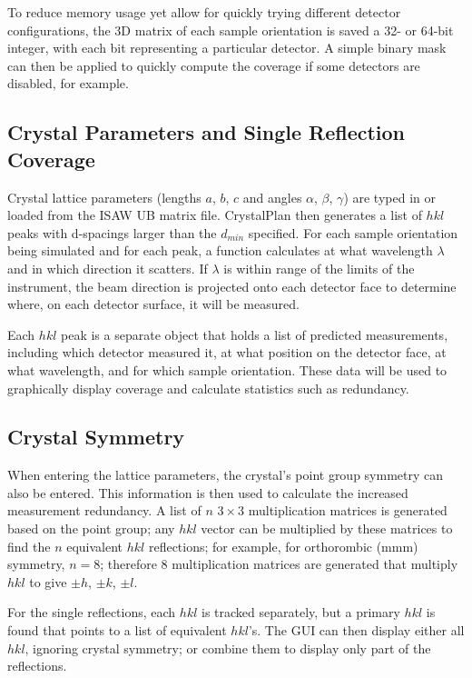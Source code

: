 \documentclass[final]{iucr}              %
\begin{document}
To reduce memory usage yet allow for quickly trying different detector
configurations, the 3D matrix of each sample orientation is saved a 32- or
64-bit integer, with each bit representing a particular detector. A simple
binary mask can then be applied to quickly compute the coverage if some
detectors are disabled, for example.          




\subsection{Crystal Parameters and Single Reflection Coverage}

Crystal lattice parameters (lengths $a$, $b$, $c$ and angles $\alpha$, $\beta$,
$\gamma$) are typed in or loaded from the ISAW UB matrix file. CrystalPlan then
generates a list of $hkl$ peaks with d-spacings larger than the $d_{min}$
specified. For each sample orientation being simulated and for each peak, a function calculates at
what wavelength $\lambda$ and in which direction it scatters. If $\lambda$ 
is within range of the limits of the instrument, the beam direction is projected
onto each detector face to determine where, on each detector surface, it will be
measured. 
 
Each $hkl$ peak is a separate object that holds a list of predicted
measurements, including which detector measured it, at what position on the
detector face, at what wavelength, and for which sample orientation. These data
will be used to  graphically display coverage and calculate statistics such as
redundancy. 



\subsection{Crystal Symmetry}

When entering the lattice parameters, the crystal's point group symmetry can
also be entered. This information is then used to calculate the increased
measurement redundancy. A list of $n$ $3\times3$ multiplication matrices is
generated based on the point group; any $hkl$ vector can be multiplied by
these matrices to find the $n$ equivalent $hkl$ reflections; for example, for
orthorombic (mmm) symmetry, $n=8$; therefore 8 multiplication matrices are
generated that multiply $hkl$ to give $\pm h$, $\pm k$, $\pm l$.              

For the single reflections, each $hkl$ is tracked separately, but a primary
$hkl$ is found that points to a list of equivalent $hkl$'s. The GUI can then display
either all $hkl$, ignoring crystal symmetry; or combine them to display only part of
the reflections.             
\end{document}
